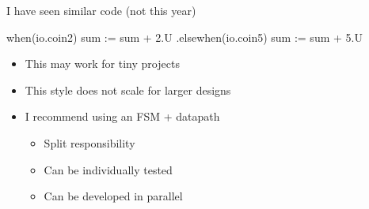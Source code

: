 \begin{frame}[fragile]{I have seen similar code (not this year)}
\begin{chisel}
  when(io.coin2) {
    sum := sum + 2.U
  } .elsewhen(io.coin5) {
    sum := sum + 5.U
  }
\end{chisel}
\begin{itemize}
\item This may work for tiny projects
\item This style does not scale for larger designs
\item I recommend using an FSM + datapath
\begin{itemize}
\item Split responsibility
\item Can be individually tested
\item Can be developed in parallel
\end{itemize}
\end{itemize}
\end{frame}
%
%




